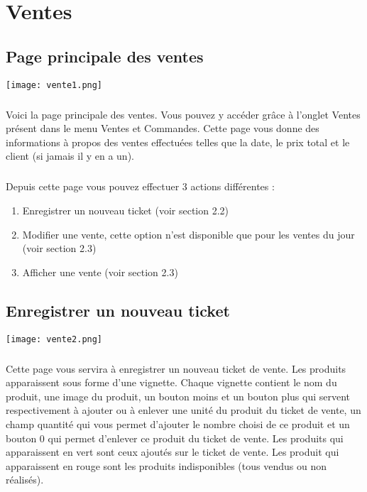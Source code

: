 \chapter{Ventes}

\section{Page principale des ventes}

\texttt{[image: vente1.png]}

\paragraph{} Voici la page principale des ventes. Vous pouvez y accéder grâce à
l'onglet Ventes présent dans le menu Ventes et Commandes. Cette page vous donne
des informations à propos des ventes effectuées telles que la date, le prix
total et le client (si jamais il y en a un).

\paragraph{} Depuis cette page vous pouvez effectuer 3 actions différentes :
\begin{enumerate}
    \item Enregistrer un nouveau ticket (voir section 2.2)
    \item Modifier une vente, cette option n'est disponible que pour les ventes
    du jour (voir section 2.3)
    \item Afficher une vente (voir section 2.3)
\end{enumerate}

\section{Enregistrer un nouveau ticket}

\texttt{[image: vente2.png]}

\paragraph{} Cette page vous servira à enregistrer un nouveau ticket de vente.
Les produits apparaissent sous forme d'une vignette. Chaque vignette contient
le nom du produit, une image du produit, un bouton moins et un bouton plus qui
servent respectivement à ajouter ou à enlever une unité du produit du ticket de
vente, un champ quantité qui vous permet d'ajouter le nombre choisi de ce
produit et un bouton 0 qui permet d'enlever ce produit du ticket de vente. Les
produits qui apparaissent en vert sont ceux ajoutés sur le ticket de vente. Les
produit qui apparaissent en rouge sont les produits indisponibles (tous vendus
ou non réalisés).

